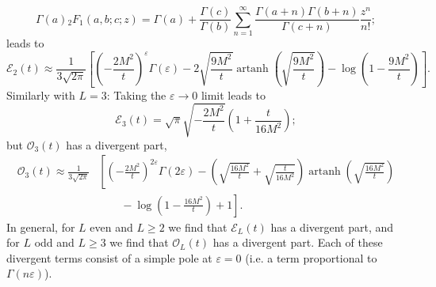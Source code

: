 \begin{equation}
	\Gamma(a) {}_{2}F_{1}(a, b; c; z) = \Gamma(a) + \frac{\Gamma(c)}{\Gamma(b)} \sum_{n = 1}^{\infty} \frac{\Gamma(a + n) \Gamma(b + n)}{\Gamma(c + n)} \frac{z^{n}}{n!};
\end{equation}
leads to
\begin{equation}
	\mathcal{E}_{2}(t) \approx \frac{1}{3 \sqrt{2 \pi}} \left[ \left(- \frac{2M^{2}}{t} \right)^{\varepsilon}\Gamma(\varepsilon) - 2 \sqrt{\frac{9M^{2}}{t}} \operatorname{artanh}{\left( \sqrt{\frac{9M^{2}}{t}} \right)} - \log{\left(1 - \frac{9 M^{2}}{t} \right)} \right].
\end{equation}
Similarly with $L = 3$: Taking the $\varepsilon \rightarrow 0$ limit leads to
\begin{equation}
	\mathcal{E}_{3}(t) = \sqrt{\pi} \sqrt{- \frac{2M^{2}}{t}} \left( 1 + \frac{t}{16M^{2}} \right);
\end{equation}
but $\mathcal{O}_{3}(t)$ has a divergent part,
\begin{equation}
\begin{split}
	\mathcal{O}_{3}(t) \approx \frac{1}{3\sqrt{2 \pi}} &{} \left[ \left(- \frac{2M^{2}}{t} \right)^{2\varepsilon}\Gamma(2\varepsilon) - \left( \sqrt{\frac{16 M^{2}}{t}} + \sqrt{\frac{t}{16 M^{2}}} \right) \operatorname{artanh}{\left( \sqrt{\frac{16M^{2}}{t}} \right)} \right. \\
	& \qquad - \left. \log{\left(1 - \frac{16 M^{2}}{t} \right)} + 1 \right].
\end{split}
\end{equation}
In general, for $L$ even and $L \geq 2$ we find that $\mathcal{E}_{L}(t)$ has a divergent part, and for $L$ odd and $L \geq 3$ we find that $\mathcal{O}_{L}(t)$ has a divergent part. Each of these divergent terms consist of a simple pole at $\varepsilon = 0$ (i.e. a term proportional to $\Gamma(n \varepsilon)$).